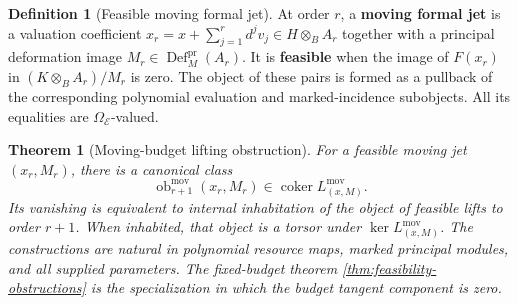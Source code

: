 \documentclass[11pt,a4paper]{article}
\numberwithin{algorithm}{section}
\numberwithin{equation}{section}
\newtheorem{theorem}{Theorem}[section]
\theoremstyle{definition}
\newtheorem{definition}[definition]{Definition}
\theoremstyle{remark}
\theoremstyle{plain}
\newcommand{\E}{\mathcal E}
\newcommand{\Truth}{\Omega_{\E}}
\theoremstyle{definition}
\theoremstyle{plain}
\begin{document}
\begin{definition}[Feasible moving formal jet]
\label{def:moving-formal-feasible}
At order $r$, a \textbf{moving formal jet} is a valuation coefficient
$x_r=x+\sum_{j=1}^r d^jv_j\in H\otimes_BA_r$
together with a principal deformation image
$M_r\in\operatorname{Def}^{\mathrm{pr}}_M(A_r)$.
It is \textbf{feasible} when the image of $F(x_r)$ in
$(K\otimes_BA_r)/M_r$ is zero.  The object of these pairs is
formed as a pullback of the corresponding polynomial evaluation
and marked-incidence subobjects.  All its equalities are
$\Truth$-valued.
\end{definition}

\begin{theorem}[Moving-budget lifting obstruction]
\label{thm:moving-budget-obstructions}
For a feasible moving jet $(x_r,M_r)$, there is a canonical class
\begin{equation}\label{eq:moving-budget-obstruction}
 \operatorname{ob}^{\mathrm{mov}}_{r+1}(x_r,M_r)
 \in\operatorname{coker}L^{\mathrm{mov}}_{(x,M)}.
\end{equation}
Its vanishing is equivalent to internal inhabitation of the
object of feasible lifts to order $r+1$.  When inhabited, that
object is a torsor under $\ker L^{\mathrm{mov}}_{(x,M)}$.
The constructions are natural in polynomial resource maps,
marked principal modules, and all supplied parameters.  The
fixed-budget theorem \cref{thm:feasibility-obstructions} is the
specialization in which the budget tangent component is zero.
\end{theorem}
\end{document}
